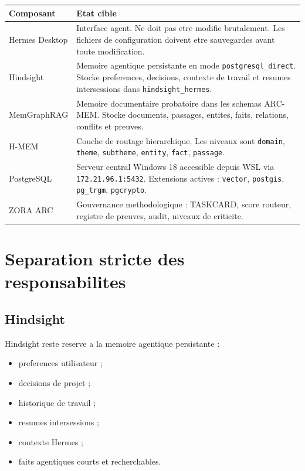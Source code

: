 \documentclass[11pt,a4paper]{article}
\begin{document}
\begin{longtable}{|p{3.2cm}|p{11cm}|}
\hline
\textbf{Composant} & \textbf{Etat cible} \\
\hline
Hermes Desktop & Interface agent. Ne doit pas etre modifie brutalement. Les
fichiers de configuration doivent etre sauvegardes avant toute modification. \\
\hline
Hindsight & Memoire agentique persistante en mode \texttt{postgresql\_direct}.
Stocke preferences, decisions, contexte de travail et resumes intersessions dans
\texttt{hindsight\_hermes}. \\
\hline
MemGraphRAG & Memoire documentaire probatoire dans les schemas ARC-MEM. Stocke
documents, passages, entites, faits, relations, conflits et preuves. \\
\hline
H-MEM & Couche de routage hierarchique. Les niveaux sont \texttt{domain},
\texttt{theme}, \texttt{subtheme}, \texttt{entity}, \texttt{fact},
\texttt{passage}. \\
\hline
PostgreSQL & Serveur central Windows 18 accessible depuis WSL via
\texttt{172.21.96.1:5432}. Extensions actives : \texttt{vector},
\texttt{postgis}, \texttt{pg\_trgm}, \texttt{pgcrypto}. \\
\hline
ZORA ARC & Gouvernance methodologique : TASKCARD, score routeur, registre de
preuves, audit, niveaux de criticite. \\
\hline
\end{longtable}

\section{Separation stricte des responsabilites}

\subsection{Hindsight}

Hindsight reste reserve a la memoire agentique persistante :

\begin{itemize}[leftmargin=*]
  \item preferences utilisateur ;
  \item decisions de projet ;
  \item historique de travail ;
  \item resumes intersessions ;
  \item contexte Hermes ;
  \item faits agentiques courts et recherchables.
\end{itemize}
\end{document}
